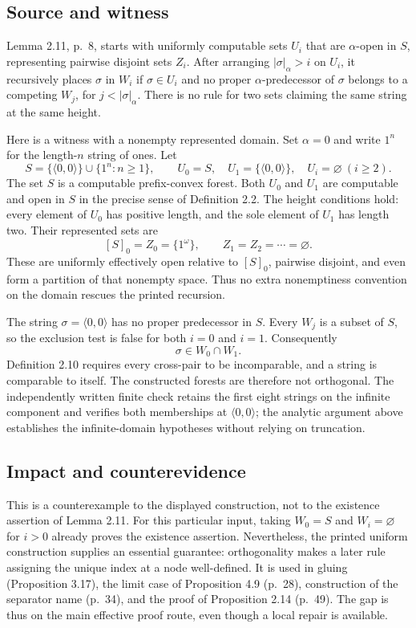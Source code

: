 \documentclass[10pt]{article}
\begin{document}
\subsection*{Source and witness}
Lemma 2.11, p. 8, starts with uniformly computable sets \(U_i\) that are \(\alpha\)-open in \(S\), representing pairwise disjoint sets \(Z_i\). After arranging \(|\sigma|_\alpha>i\) on \(U_i\), it recursively places \(\sigma\) in \(W_i\) if \(\sigma\in U_i\) and no proper \(\alpha\)-predecessor of \(\sigma\) belongs to a competing \(W_j\), for \(j<|\sigma|_\alpha\). There is no rule for two sets claiming the same string at the same height.\par
Here is a witness with a nonempty represented domain. Set \(\alpha=0\) and write \(1^n\) for the length-\(n\) string of ones. Let \[S=\{\langle0,0\rangle\}\cup\{1^n:n\geq1\},\qquad
 U_0=S,\quad U_1=\{\langle0,0\rangle\},\quad U_i=\varnothing\ (i\geq2).\] The set \(S\) is a computable prefix-convex forest. Both \(U_0\) and \(U_1\) are computable and open in \(S\) in the precise sense of Definition 2.2. The height conditions hold: every element of \(U_0\) has positive length, and the sole element of \(U_1\) has length two. Their represented sets are \[[S]_0=Z_0=\{1^\omega\},\qquad Z_1=Z_2=\cdots=\varnothing.\] These are uniformly effectively open relative to \([S]_0\), pairwise disjoint, and even form a partition of that nonempty space. Thus no extra nonemptiness convention on the domain rescues the printed recursion.\par
The string \(\sigma=\langle0,0\rangle\) has no proper predecessor in \(S\). Every \(W_j\) is a subset of \(S\), so the exclusion test is false for both \(i=0\) and \(i=1\). Consequently \[\sigma\in W_0\cap W_1.\] Definition 2.10 requires every cross-pair to be incomparable, and a string is comparable to itself. The constructed forests are therefore not orthogonal. The independently written finite check retains the first eight strings on the infinite component and verifies both memberships at \(\langle0,0\rangle\); the analytic argument above establishes the infinite-domain hypotheses without relying on truncation.\par
\subsection*{Impact and counterevidence}
This is a counterexample to the displayed construction, not to the existence assertion of Lemma 2.11. For this particular input, taking \(W_0=S\) and \(W_i=\varnothing\) for \(i>0\) already proves the existence assertion. Nevertheless, the printed uniform construction supplies an essential guarantee: orthogonality makes a later rule assigning the unique index at a node well-defined. It is used in gluing (Proposition 3.17), the limit case of Proposition 4.9 (p. 28), construction of the separator name (p. 34), and the proof of Proposition 2.14 (p. 49). The gap is thus on the main effective proof route, even though a local repair is available.\par
\end{document}
